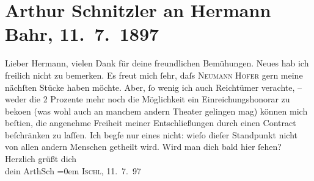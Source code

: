 

         
         \renewcommand{\erwaehntePersonen}{Personen: Hermann Bahr, Gilbert Otto Neumann-Hofer}
         \renewcommand{\erwaehnteOrte}{Orte: Bad Ischl, Wien}
         \renewcommand{\erwaehnteWerke}{}
               \section[Arthur Schnitzler an Hermann Bahr, 11. 7. 1897]{ Arthur Schnitzler an Hermann Bahr, 11. 7. 1897}\nopagebreak{}\rehead{ }\begin{ledgroupsized}[t]{13cm}\normalsize\beginnumbering \toendnotes[C]{\smallbreak\pagebreak[2]} 
\pstart{}{\pb}Lieber Hermann, \pend\pstart
           vielen Dank für deine freundlichen Bemühungen. Neues hab ich freilich nicht zu
               bemerken. Es freut mich ſehr, daſs \textsc{Neumann
                  Hofer} gern meine nächſten Stücke haben möchte. Aber, ſo wenig {\pb}ich auch Reichtümer verachte, – weder die 2 Prozente mehr
               noch die Möglichkeit ein Einreichungshonorar zu beko{\geminationm}en (was wohl auch an manchem
               andern Theater gelingen mag) können mich beſti{\geminationm}en, die angenehme Freiheit meiner
               Entschließungen durch einen Contract beſchränken zu laſſen. {\pb}Ich begfe nur eines nicht: wieſo dieſer Standpunkt nicht von allen andern Menschen
               getheilt wird.\pend
           \pstart
           Wird man dich bald hier ſehen?\pend
           \pstart
           Herzlich grüßt dich{\\[\baselineskip]}dein \spacefill\mbox{ArthSch}\pend
           \leftskip=0em{}\pstart
           \textsc{Ischl, 11. 7. 97}\pend
           
         
         \endnumbering{}\end{ledgroupsized}  \newcommand{\dateiname}{L00699}\newcommand{\titel}{Arthur Schnitzler an Hermann Bahr, 11. 7. 1897}\newcommand{\editorInnen}{ Kurt Ifkovits,  Martin Anton Müller}
      